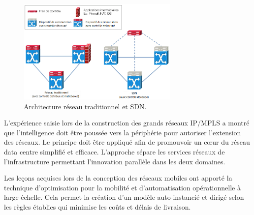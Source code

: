 \begin{figure}[h]
\begin{center}
\includegraphics[width=0.7\textwidth]{images/TraditionalVsSDN} 
\caption{Architecture réseau traditionnel et SDN. \cite{SurveySDNArchi}} \label{TraditionalVsSDN}
\end{center}
\end{figure}


L'expérience saisie lors de la construction des grands réseaux IP/MPLS a montré que l'intelligence doit être poussée vers la périphérie pour autoriser l'extension des réseaux. Le principe doit être appliqué afin de promouvoir un cœur du réseau data centre simplifié et efficace. L'approche sépare les services réseaux de l'infrastructure permettant l'innovation parallèle dans les deux domaines.


Les leçons acquises lors de la conception des réseaux mobiles ont apporté la technique d'optimisation pour la mobilité et d'automatisation opérationnelle à large échelle. Cela permet la création d'un modèle auto-instancié et dirigé selon les règles établies qui minimise les coûts et délais de livraison.

